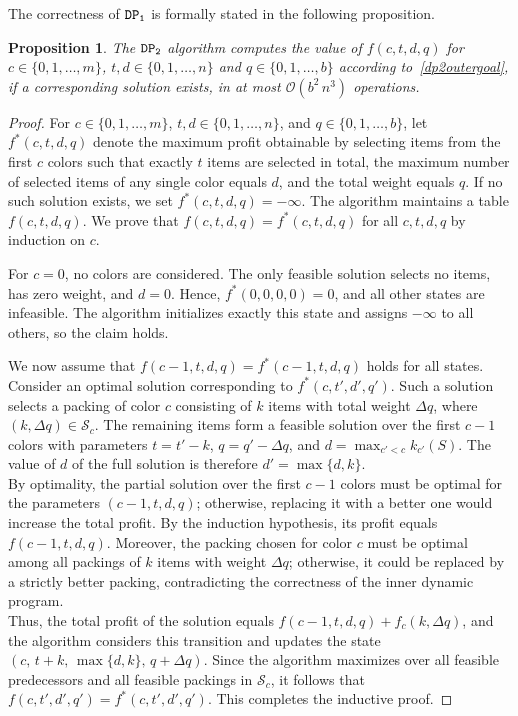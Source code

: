 \documentclass[preprint,11pt]{elsarticle}
\newcommand{\capacity}{b}
\newcommand{\firstDP}{{\tt DP_1}}
\newcommand{\secondDP}{{\tt DP_2}}
\newtheorem{proposition}{Proposition}
\theoremstyle{definition}
\begin{document}
\noindent The correctness of $\firstDP$ is formally stated in the following proposition.
\begin{proposition}
    The $\secondDP$ algorithm computes the value of $f(c,t,d,q)$ for $c \in \{0,1,\dots,m\}$, $t,d \in \{0,1,\dots,n\}$ and $q \in \{0,1,\dots,\capacity\}$ according to~\eqref{dp2outergoal}, if a corresponding solution exists, in at most $\mathcal{O}(\capacity^2 \, n^3)$ operations.
\end{proposition}
\begin{proof}
   For $c \in \{0,1,\dots,m\}$, $t,d \in \{0,1,\dots,n\}$, and $q \in \{0,1,\dots,\capacity\}$, let $f^*(c,t,d,q)$ denote the maximum profit obtainable by selecting items from the first $c$ colors such that exactly $t$ items are selected in total, the maximum number of selected items of any single color equals $d$, and the total weight equals $q$. If no such solution exists, we set $f^*(c,t,d,q) = -\infty$. 
The algorithm maintains a table $f(c,t,d,q)$. We prove that $f(c,t,d,q) = f^*(c,t,d,q)$ for all $c,t,d,q$ by induction on $c$.

\smallskip

For $c=0$, no colors are considered.
The only feasible solution selects no items, has zero weight, and $d=0$. Hence, $f^*(0,0,0,0)= 0$, and all other states are infeasible. 
The algorithm initializes exactly this state and assigns $-\infty$ to all others, so the claim holds.

\smallskip

We now assume that $f(c-1,t,d,q) = f^*(c-1,t,d,q)$ holds for all states. Consider an optimal solution corresponding to $f^*(c,t',d',q')$.
Such a solution selects a packing of color $c$ consisting of $k$ items with total weight $\Delta q$, where $(k,\Delta q) \in \mathcal{S}_c$.
The remaining items form a feasible solution over the first $c-1$ colors with parameters $t = t' - k$, $q = q' - \Delta q$, and $d = \max_{c' < c} k_{c'}(S)$. 
The value of $d$ of the full solution is therefore $d' = \max\{d,k\}$. \\
By optimality, the partial solution over the first $c-1$ colors must be optimal for the parameters $(c-1,t,d,q)$; otherwise, replacing it with a better one would increase the total profit. 
By the induction hypothesis, its profit equals $f(c-1,t,d,q)$. 
Moreover, the packing chosen for color $c$ must be optimal among all packings of $k$ items with weight $\Delta q$; otherwise, it could be replaced by a strictly better packing, contradicting the correctness of the inner dynamic program. \\
Thus, the total profit of the solution equals $f(c-1,t,d,q) + f_c(k,\Delta q)$,
and the algorithm considers this transition and updates the state
$(c,\, t+k,\, \max\{d,k\},\, q+\Delta q)$. Since the algorithm maximizes over all feasible predecessors and all feasible packings in
$\mathcal{S}_c$, it follows that $f(c,t',d',q') = f^*(c,t',d',q')$.
This completes the inductive proof.


\end{proof}
\end{document}
